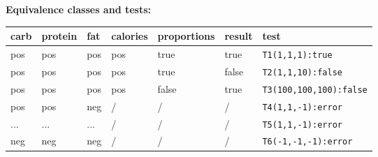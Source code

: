 \documentclass[12pt]{article}
\begin{document}
\textbf{Equivalence classes and tests:}
\begin{center}
  \begin{tabular}{|l|l|l|l|l|l|l|}
    \hline
    carb & protein & fat & calories & proportions & result & test \\
    \hline
    pos & pos & pos & pos & true & true & \texttt{T1(1,1,1):true} \\
    \hline
    pos & pos & pos & pos & true & false & \texttt{T2(1,1,10):false} \\
    \hline
    pos & pos & pos & pos & false & true & \texttt{T3(100,100,100):false} \\
    \hline
    pos & pos & neg & / & / & / & \texttt{T4(1,1,-1):error} \\
    \hline
    ... & ... & ... & / & / & / & \texttt{T5(1,1,-1):error} \\
    \hline
    neg & neg & neg & / & / & / & \texttt{T6(-1,-1,-1):error} \\
    \hline
  \end{tabular}
\end{center}
\end{document}
